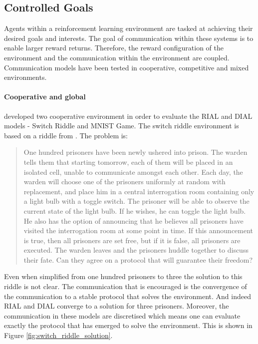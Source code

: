 \documentclass{article}
\begin{document}
\subsection{Controlled Goals}


Agents within a reinforcement learning environment are tasked at achieving their desired goals and interests. The goal of communication within these systems is to enable larger reward returns. Therefore, the reward configuration of the environment and the communication within the environment are coupled. Communication models have been tested in cooperative, competitive and mixed environments.

\paragraph{Cooperative and global}

\citet{foerster2016learning} developed two cooperative environment in order to evaluate the RIAL and DIAL models - Switch Riddle and MNIST Game. The switch riddle environment is based on a riddle from \citet{wu2002prisoners}. The problem is:

\begin{quote}
One hundred prisoners have been newly ushered into prison. The warden tells them that starting tomorrow, each of them will be placed in an isolated cell, unable to communicate amongst each other. Each day, the warden will choose one of the prisoners uniformly at random with replacement, and place him in a central interrogation room containing only a light bulb with a toggle switch. The prisoner will be able to observe the current state of the light bulb. If he wishes, he can toggle the light bulb. He also has the option of announcing that he believes all prisoners have visited the interrogation room at some point in time. If this announcement is true, then all prisoners are set free, but if it is false, all prisoners are executed. The warden leaves and the prisoners huddle together to discuss their fate. Can they agree on a protocol that will guarantee their freedom?
\end{quote}

Even when simplified from one hundred prisoners to three the solution to this riddle is not clear. The communication that is encouraged is the convergence of the communication to a stable protocol that solves the environment. And indeed RIAL and DIAL converge to a solution for three prisoners. Moreover, the communication in these models are discretised which means one can evaluate exactly the protocol that has emerged to solve the environment. This is shown in Figure \ref{fig:switch_riddle_solution}.
\end{document}
